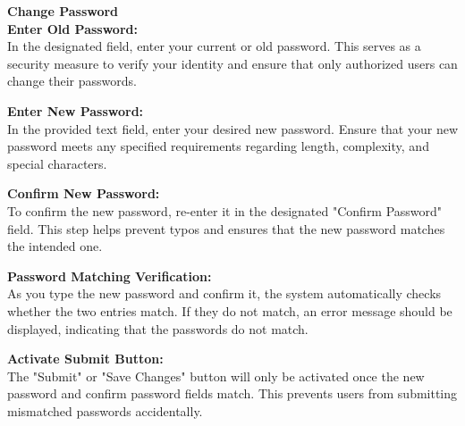 \documentclass{article}
\begin{document}
\textbf{Change Password}\\
\textbf{Enter Old Password:}\\
In the designated field, enter your current or old password. This serves as a security measure to verify your identity and ensure that only authorized users can change their passwords.

\textbf{Enter New Password:}\\
In the provided text field, enter your desired new password. Ensure that your new password meets any specified requirements regarding length, complexity, and special characters.

\textbf{Confirm New Password:}\\
To confirm the new password, re-enter it in the designated "Confirm Password" field. This step helps prevent typos and ensures that the new password matches the intended one.

\textbf{Password Matching Verification:}\\
As you type the new password and confirm it, the system automatically checks whether the two entries match. If they do not match, an error message should be displayed, indicating that the passwords do not match.

\textbf{Activate Submit Button:}\\
The "Submit" or "Save Changes" button will only be activated once the new password and confirm password fields match. This prevents users from submitting mismatched passwords accidentally.
\end{document}
